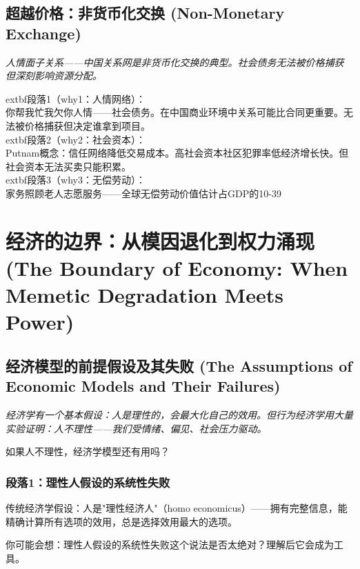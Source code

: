 \documentclass[a4paper,12pt]{book}
\newenvironment{motivation}{\begin{tcolorbox}[colback=gray!10,colframe=gray!60,title=\textit{本章动机},fonttitle=\bfseries,arc=0mm,leftrule=3mm]\small\itshape}{\end{tcolorbox}}
\newenvironment{questionbox}{\begin{tcolorbox}[colback=red!3!white,colframe=red!60!black]}{\end{tcolorbox}}
\begin{document}
\begin{motivation}
\begin{motivation}
	\subsection{超越价格：非货币化交换 (Non-Monetary Exchange)}
	\begin{motivation}人情面子关系——中国关系网是非货币化交换的典型。社会债务无法被价格捕获但深刻影响资源分配。\end{motivation}
		extbf{段落1（why1：人情网络）}：\\你帮我忙我欠你人情——社会债务。在中国商业环境中关系可能比合同更重要。无法被价格捕获但决定谁拿到项目。\\	extbf{段落2（why2：社会资本）}：\\Putnam概念：信任网络降低交易成本。高社会资本社区犯罪率低经济增长快。但社会资本无法买卖只能积累。\\	extbf{段落3（why3：无偿劳动）}：\\家务照顾老人志愿服务——全球无偿劳动价值估计占GDP的10-39%


	\section{经济的边界：从模因退化到权力涌现 (The Boundary of Economy: When Memetic Degradation Meets Power)}

	\subsection{经济模型的前提假设及其失败 (The Assumptions of Economic Models and Their Failures)}
	\begin{motivation}
		经济学有一个基本假设：人是理性的，会最大化自己的效用。但行为经济学用大量实验证明：人不理性——我们受情绪、偏见、社会压力驱动。
	\end{motivation}
	\begin{questionbox}
		如果人不理性，经济学模型还有用吗？
	\end{questionbox}

	\subsubsection*{段落1：理性人假设的系统性失败}
	传统经济学假设：人是"理性经济人"（homo economicus）——拥有完整信息，能精确计算所有选项的效用，总是选择效用最大的选项。
	\begin{tcolorbox}[colback=yellow!5, title=\textit{读者行为预测}]
		你可能会想：理性人假设的系统性失败这个说法是否太绝对？理解后它会成为工具。
	\end{tcolorbox}


\end{motivation}
\end{motivation}
\end{document}
